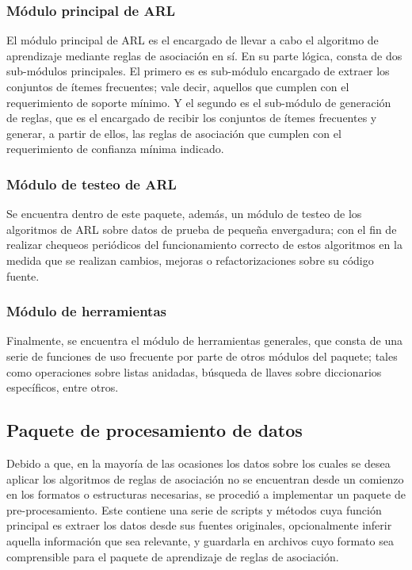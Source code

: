 \subsubsection{Módulo principal de ARL}

El módulo principal de ARL es el encargado de llevar a cabo el algoritmo de aprendizaje mediante reglas de asociación en sí. En su parte lógica, consta de dos sub-módulos principales. El primero es es sub-módulo encargado de extraer los conjuntos de ítemes frecuentes; vale decir, aquellos que cumplen con el requerimiento de soporte mínimo. Y el segundo es el sub-módulo de generación de reglas, que es el encargado de recibir los conjuntos de ítemes frecuentes y generar, a partir de ellos, las reglas de asociación que cumplen con el requerimiento de confianza mínima indicado.

\subsubsection{Módulo de testeo de ARL}

Se encuentra dentro de este paquete, además, un módulo de testeo de los algoritmos de ARL sobre datos de prueba de pequeña envergadura; con el fin de realizar chequeos periódicos del funcionamiento correcto de estos algoritmos en la medida que se realizan cambios, mejoras o refactorizaciones sobre su código fuente.

\subsubsection{Módulo de herramientas}

Finalmente, se encuentra el módulo de herramientas generales, que consta de una serie de funciones de uso frecuente por parte de otros módulos del paquete; tales como operaciones sobre listas anidadas, búsqueda de llaves sobre diccionarios específicos, entre otros.

\subsection{Paquete de procesamiento de datos}

Debido a que, en la mayoría de las ocasiones los datos sobre los cuales se desea aplicar los algoritmos de reglas de asociación no se encuentran desde un comienzo en los formatos o estructuras necesarias, se procedió a implementar un paquete de pre-procesamiento. Este contiene una serie de scripts y métodos cuya función principal es extraer los datos desde sus fuentes originales, opcionalmente inferir aquella información que sea relevante, y guardarla en archivos cuyo formato sea comprensible para el paquete de aprendizaje de reglas de asociación.

